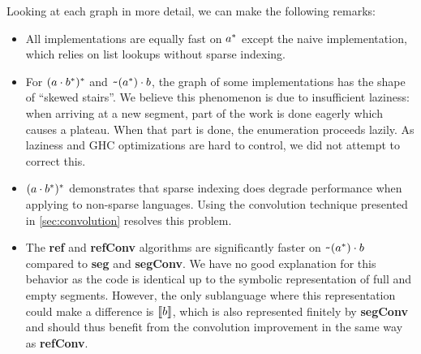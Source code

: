 Looking at each graph in more detail, we can make the following
remarks:
\begin{itemize}[leftmargin=*]
\item All implementations are equally fast on $a^*$ except
  the naive implementation, which  relies on list lookups without
  sparse indexing.
\item For $(a \cdot{b^*})^*$ and
  $\texttt{\textasciitilde}{(a^*)} \cdot{b}$, the graph of some implementations
  has the shape of ``skewed stairs''. We believe this phenomenon is due to
  insufficient laziness: when arriving at a new segment, part of the
  work is done eagerly which causes a plateau. When that part is done,
  the enumeration proceeds lazily.  As laziness and GHC
  optimizations are hard to control, we did not attempt to correct this.
\item $(a \cdot{b^*})^*$ demonstrates that sparse indexing
  does degrade performance when applying  to non-sparse languages.
  Using the convolution technique presented in \cref{sec:convolution} resolves this problem.
\item The \textbf{ref} and \textbf{refConv} algorithms are
  significantly faster on $\texttt{\textasciitilde}{(a^*)} \cdot{b}$
  compared to \textbf{seg} and \textbf{segConv}. We have no good
  explanation for this behavior as the code is identical up to the
  symbolic representation of full and empty segments. However, the
  only sublanguage where this representation could make a difference
  is $\llbracket b\rrbracket$, which is also represented finitely by
  \textbf{segConv} and should thus benefit from the convolution
  improvement in the same way as \textbf{refConv}.
\end{itemize}


